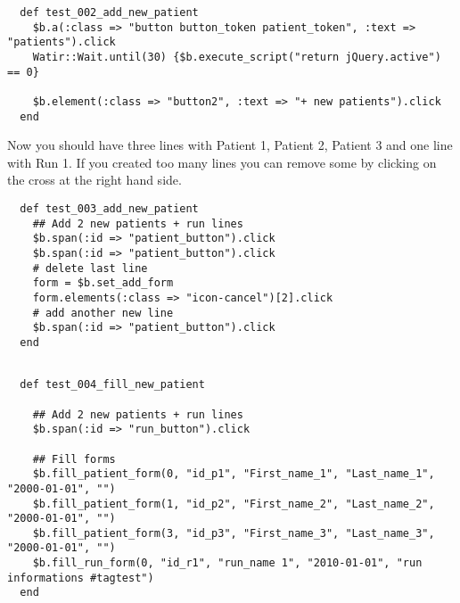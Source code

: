 \begin{verbatim}
  def test_002_add_new_patient
    $b.a(:class => "button button_token patient_token", :text => "patients").click
    Watir::Wait.until(30) {$b.execute_script("return jQuery.active") == 0}

    $b.element(:class => "button2", :text => "+ new patients").click
  end

\end{verbatim}

  Now you should have three lines with Patient 1, Patient 2, Patient 3 and one
  line with Run 1.
  If you created too many lines you can remove some by clicking on the cross at
  the right hand side.

\begin{verbatim}
  def test_003_add_new_patient
    ## Add 2 new patients + run lines
    $b.span(:id => "patient_button").click
    $b.span(:id => "patient_button").click
    # delete last line
    form = $b.set_add_form
    form.elements(:class => "icon-cancel")[2].click
    # add another new line
    $b.span(:id => "patient_button").click
  end

\end{verbatim}

\begin{verbatim}
 
  def test_004_fill_new_patient

    ## Add 2 new patients + run lines
    $b.span(:id => "run_button").click

    ## Fill forms
    $b.fill_patient_form(0, "id_p1", "First_name_1", "Last_name_1", "2000-01-01", "")
    $b.fill_patient_form(1, "id_p2", "First_name_2", "Last_name_2", "2000-01-01", "")
    $b.fill_patient_form(3, "id_p3", "First_name_3", "Last_name_3", "2000-01-01", "")
    $b.fill_run_form(0, "id_r1", "run_name 1", "2010-01-01", "run informations #tagtest")
  end

\end{verbatim}

